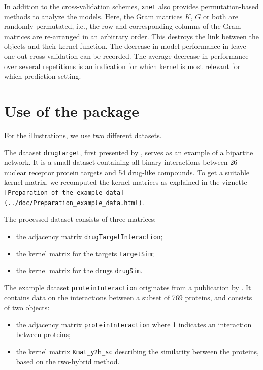 \documentclass[
]{article}
\providecommand{\tightlist}{%
  \setlength{\itemsep}{0pt}\setlength{\parskip}{0pt}}
\begin{document}
In addition to the cross-validation schemes, \texttt{xnet} also provides
permutation-based methods to analyze the models. Here, the Gram matrices
\(K\), \(G\) or both are randomly permutated, i.e., the row and
corresponding columns of the Gram matrices are re-arranged in an
arbitrary order. This destroys the link between the objects and their
kernel-function. The decrease in model performance in leave-one-out
cross-validation can be recorded. The average decrease in performance
over several repetitions is an indication for which kernel is most
relevant for which prediction setting.

\hypertarget{use-of-the-package}{%
\section{Use of the package}\label{use-of-the-package}}

\label{sec:useofpackage}

For the illustrations, we use two different datasets.

The dataset \texttt{drugtarget}, first presented by
\citet{Yamanishi2008}, serves as an example of a bipartite network. It
is a small dataset containing all binary interactions between 26 nuclear
receptor protein targets and 54 drug-like compounds. To get a suitable
kernel matrix, we recomputed the kernel matrices as explained in the
vignette
\texttt{{[}Preparation\ of\ the\ example\ data{]}(../doc/Preparation\_example\_data.html)}.

The processed dataset consists of three matrices:

\begin{itemize}
\tightlist
\item
  the adjacency matrix \texttt{drugTargetInteraction};
\item
  the kernel matrix for the targets \texttt{targetSim};
\item
  the kernel matrix for the drugs \texttt{drugSim}.
\end{itemize}

The example dataset \texttt{proteinInteraction} originates from a
publication by \citet{Yamanishi2004}. It contains data on the
interactions between a subset of 769 proteins, and consists of two
objects:

\begin{itemize}
\tightlist
\item
  the adjacency matrix \texttt{proteinInteraction} where 1 indicates an
  interaction between proteins;
\item
  the kernel matrix \texttt{Kmat\_y2h\_sc} describing the similarity
  between the proteins, based on the two-hybrid method.
\end{itemize}
\end{document}

